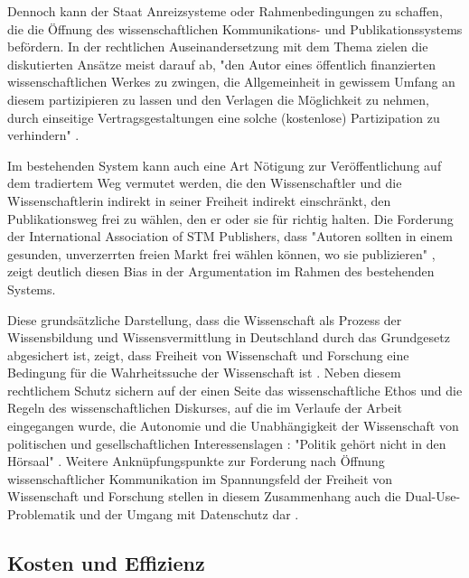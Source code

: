 Dennoch kann der Staat Anreizsysteme oder Rahmenbedingungen zu schaffen, die die Öffnung des wissenschaftlichen Kommunikations- und Publikationssystems befördern. In der rechtlichen Auseinandersetzung mit dem Thema zielen die diskutierten Ansätze meist darauf ab, "den Autor eines öffentlich finanzierten wissenschaftlichen Werkes zu zwingen, die Allgemeinheit in gewissem Umfang an diesem partizipieren zu lassen und den Verlagen die Möglichkeit zu nehmen, durch einseitige Vertragsgestaltungen eine solche (kostenlose) Partizipation zu verhindern" \cite{dorschel_2006_open}.

Im bestehenden System kann auch eine Art Nötigung zur Veröffentlichung auf dem tradiertem Weg vermutet werden, die den Wissenschaftler und die Wissenschaftlerin indirekt in seiner Freiheit indirekt einschränkt, den Publikationsweg frei zu wählen, den er oder sie für richtig halten. Die Forderung der International Association of STM Publishers, dass "Autoren sollten in einem gesunden, unverzerrten freien Markt frei wählen können, wo sie publizieren" \cite{Brussels_Declaration_2007}, zeigt deutlich diesen Bias in der Argumentation im Rahmen des bestehenden Systems.

Diese grundsätzliche Darstellung, dass die Wissenschaft als Prozess der Wissensbildung und Wissensvermittlung in Deutschland durch das Grundgesetz abgesichert ist, zeigt, dass Freiheit von Wissenschaft und Forschung eine Bedingung für die Wahrheitssuche der Wissenschaft ist \cite{Oezmen_2015}. Neben diesem rechtlichem Schutz sichern auf der einen Seite das wissenschaftliche Ethos und die Regeln des wissenschaftlichen Diskurses, auf die im Verlaufe der Arbeit eingegangen wurde, die Autonomie und die Unabhängigkeit der Wissenschaft von politischen und gesellschaftlichen Interessenslagen \cite{Oezmen_2015}: "Politik gehört nicht in den Hörsaal" \cite[:494]{Weber_1992}. Weitere Anknüpfungspunkte zur Forderung nach Öffnung wissenschaftlicher Kommunikation im Spannungsfeld der Freiheit von Wissenschaft und Forschung stellen in diesem Zusammenhang auch die Dual-Use-Problematik und der Umgang mit Datenschutz dar \cite{Fritsch_2015}.

\subsection{Kosten und Effizienz}

